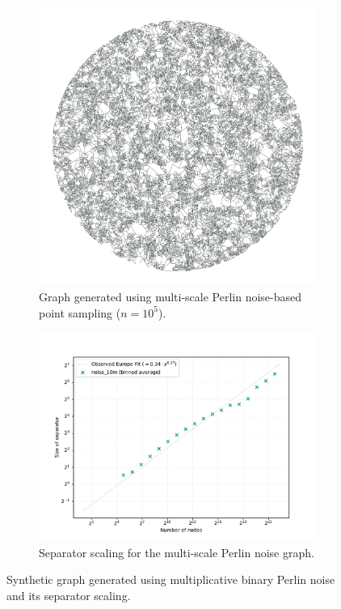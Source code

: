 \begin{figure}[tbhp]
	\centering
	\begin{subfigure}{0.35\linewidth}
		\centering
		\includegraphics[width=\linewidth]{graphics/noise.png}
		\caption{Graph generated using multi-scale Perlin noise-based point sampling (\(n = 10^5\)).}
		\label{fig:fractal_noise_graph_viz}
	\end{subfigure}
	\hfill
	\begin{subfigure}{0.55\linewidth}
		\centering
		\includegraphics[width=\linewidth]{graphics/noise_10m.pdf}
		\caption{Separator scaling for the multi-scale Perlin noise graph.}
		\label{fig:fractal_noise_graph_sep_plot}
	\end{subfigure}
	\caption{Synthetic graph generated using multiplicative binary Perlin noise and its separator scaling.}
	\label{fig:fractal_noise_graph_results}
\end{figure}

